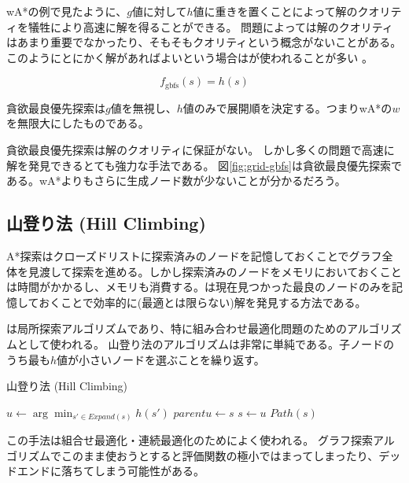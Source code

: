 wA*の例で見たように、$g$値に対して$h$値に重きを置くことによって解のクオリティを犠牲により高速に解を得ることができる。
問題によっては解のクオリティはあまり重要でなかったり、そもそもクオリティという概念がないことがある。
このようにとにかく解があればよいという場合はが使われることが多い \cite{wilt2010comparison}。

\begin{equation}
  f_{\text{gbfs}}(s) = h(s)
\end{equation}

貪欲最良優先探索は$g$値を無視し、$h$値のみで展開順を決定する。つまりwA*の$w$を無限大にしたものである。

貪欲最良優先探索は解のクオリティに保証がない。
しかし多くの問題で高速に解を発見できるとても強力な手法である。
図\ref{fig:grid-gbfs}は貪欲最良優先探索である。wA*よりもさらに生成ノード数が少ないことが分かるだろう。

\subsection{山登り法 (Hill Climbing)}
\label{sec:hill-climbing}

A*探索はクローズドリストに探索済みのノードを記憶しておくことでグラフ全体を見渡して探索を進める。しかし探索済みのノードをメモリにおいておくことは時間がかかるし、メモリも消費する。は現在見つかった最良のノードのみを記憶しておくことで効率的に(最適とは限らない)解を発見する方法である。

は局所探索アルゴリズムであり、特に組み合わせ最適化問題のためのアルゴリズムとして使われる。
山登り法のアルゴリズムは非常に単純である。子ノードのうち最も$h$値が小さいノードを選ぶことを繰り返す。

\begin{algorithm}
\caption{山登り法 (Hill Climbing)}
	 {
	  $u \leftarrow \arg \min_{s' \in Expand(s)} h(s')$\;
          $parent{u} \leftarrow s$\;
          $s \leftarrow u$\;
	}
	\Return $Path(s)$
\label{alg:hill-climbing}
\end{algorithm}

この手法は組合せ最適化・連続最適化のためによく使われる。
グラフ探索アルゴリズムでこのまま使おうとすると評価関数の極小ではまってしまったり、デッドエンドに落ちてしまう可能性がある。


